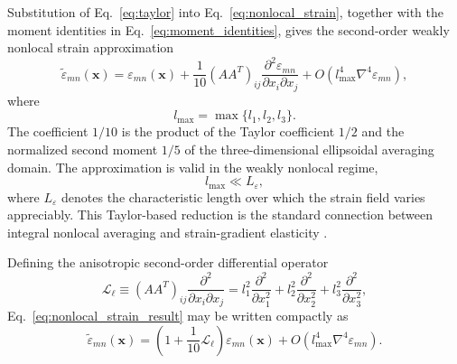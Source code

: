 \documentclass[final,3p,times,fleqn]{elsarticle}
\begin{document}
Substitution of Eq.~\eqref{eq:taylor} into
Eq.~\eqref{eq:nonlocal_strain}, together with the moment identities in
Eq.~\eqref{eq:moment_identities}, gives the second-order weakly
nonlocal strain approximation
\begin{equation}\label{eq:nonlocal_strain_result}
\tilde{\varepsilon}_{mn}(\mathbf{x})
=
\varepsilon_{mn}(\mathbf{x})
+
\frac{1}{10}
(AA^T)_{ij}
\frac{\partial^2\varepsilon_{mn}}
   {\partial x_i\partial x_j}
+
O(l_{\max}^{4}\nabla^{4}\varepsilon_{mn}) ,
\end{equation}
where
\[
  l_{\max}=\max\{l_1,l_2,l_3\}.
\]
The coefficient $1/10$ is the product of the Taylor coefficient $1/2$
and the normalized second moment $1/5$ of the three-dimensional
ellipsoidal averaging domain. The approximation is valid in the weakly
nonlocal regime,
\[
  l_{\max}\ll L_{\varepsilon},
\]
where $L_{\varepsilon}$ denotes the characteristic length over which the
strain field varies appreciably. This Taylor-based reduction is the
standard connection between integral nonlocal averaging and
strain-gradient elasticity
\cite{Aifantis1992,AskesAifantis2011}.

Defining the anisotropic second-order differential operator
\begin{equation}\label{eq:Lop}
\mathcal{L}_{\ell}
\equiv
(AA^T)_{ij}
\frac{\partial^2}{\partial x_i\partial x_j}
=
l_1^2\frac{\partial^2}{\partial x_1^2}
+
l_2^2\frac{\partial^2}{\partial x_2^2}
+
l_3^2\frac{\partial^2}{\partial x_3^2},
\end{equation}
Eq.~\eqref{eq:nonlocal_strain_result} may be written compactly as
\begin{equation}\label{eq:nonlocal_strain_compact}
\tilde{\varepsilon}_{mn}(\mathbf{x})
=
\left(
1+\frac{1}{10}\mathcal{L}_{\ell}
\right)
\varepsilon_{mn}(\mathbf{x})
+
O(l_{\max}^{4}\nabla^{4}\varepsilon_{mn}) .
\end{equation}
\end{document}

